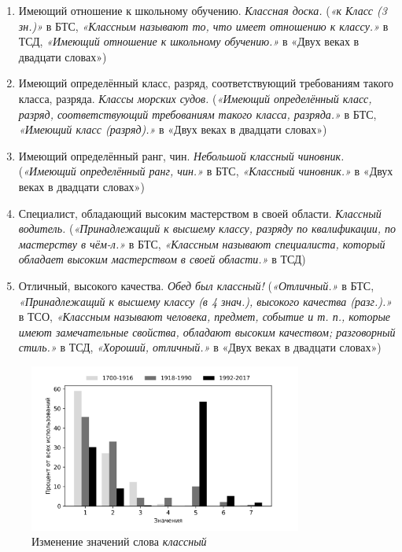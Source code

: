 \begin{enumerate}
    \item Имеющий отношение к школьному обучению. \textit{Классная доска.}
(\textit{«к Класс (3 зн.)»} в БТС,
\textit{«Классным называют то, что имеет отношению к классу.»} в ТСД,
\textit{«Имеющий отношение к школьному обучению.»} в «Двух веках в двадцати словах»)

    \item Имеющий определённый класс, разряд, соответствующий требованиям такого класса, разряда. \textit{Классы морских судов.}
(\textit{«Имеющий определённый класс, разряд, соответствующий требованиям такого класса, разряда.»} в БТС,
\textit{«Имеющий класс (разряд).»} в «Двух веках в двадцати словах»)

    \item Имеющий определённый ранг, чин. \textit{Небольшой классный чиновник.}
(\textit{«Имеющий определённый ранг, чин.»} в БТС,
\textit{«Классный чиновник.»} в «Двух веках в двадцати словах»)

    \item Специалист, обладающий высоким мастерством в своей области. \textit{Классный водитель.}
(\textit{«Принадлежащий к высшему классу, разряду по квалификации, по мастерству в чём-л.»} в БТС,
\textit{«Классным называют специалиста, который обладает высоким мастерством в своей области.»} в ТСД)

    \item Отличный, высокого качества. \textit{Обед был классный!}
(\textit{«Отличный.»} в БТС,
\textit{«Принадлежащий к высшему классу (в 4 знач.), высокого качества (разг.).»} в ТСО,
\textit{«Классным называют человека, предмет, событие и т. п., которые имеют замечательные свойства,
обладают высоким качеством; разговорный стиль.»} в ТСД,
\textit{«Хороший, отличный.»} в «Двух веках в двадцати словах»)
\end{enumerate}

\begin{figure}[H]
	\centering
	\includegraphics[width=0.8\textwidth]{img/visualizations/klassnyj_minimal}
	\caption{Изменение значений слова \textit{классный}}
	\label{fig:Классный}
\end{figure}

